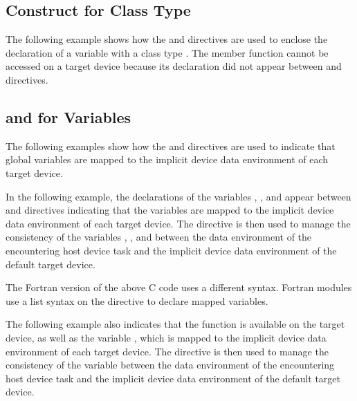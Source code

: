 \subsection{  Construct for Class Type}
\label{subsec:declare_target_class}

\cppspecificstart
The following example shows how the   and  
  directives are used to enclose the declaration 
of a variable  with a class type . The member function  cannot 
be accessed on a target device because its declaration did not appear between  
 and    directives.

\cppspecificend

\subsection{  and    for Variables}
\label{subsec:declare_target_variables}

The following examples show how the   and  
  directives are used to indicate that global variables 
are mapped to the implicit device data environment of each target device.

In the following example, the declarations of the variables , , and  appear 
between   and    
directives indicating that the variables are mapped to the implicit device data 
environment of each target device. The   directive 
is then used to manage the consistency of the variables , , and  between the 
data environment of the encountering host device task and the implicit device data 
environment of the default target device.


The Fortran version of the above C code uses a different syntax. Fortran modules 
use a list syntax on the   directive to declare 
mapped variables.


The following example also indicates that the function  is available on the 
target device, as well as the variable , which is mapped to the implicit device 
data environment of each target device. The   directive 
is then used to manage the consistency of the variable  between the data environment 
of the encountering host device task and the implicit device data environment of 
the default target device.


